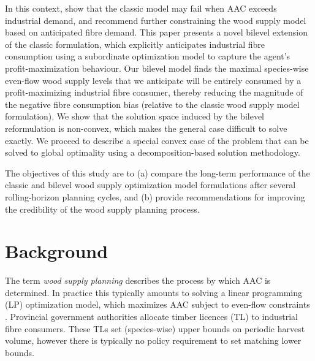 In this context, \citet{paradis2013risk} show that the classic model may fail when AAC exceeds industrial demand, and recommend further constraining the wood supply model based on anticipated fibre demand. This paper presents a novel bilevel extension of the classic formulation, which explicitly anticipates industrial fibre consumption using a subordinate optimization model to capture the agent's profit-maximization behaviour.
Our bilevel model finds the maximal species-wise even-flow wood supply levels that we anticipate will be entirely consumed by a profit-maximizing industrial fibre consumer, thereby reducing the magnitude of the negative fibre consumption bias (relative to the classic wood supply model formulation).  
We show that the solution space induced by the bilevel reformulation is non-convex, which makes the general case difficult to solve exactly. 
We proceed to describe a special convex case of the problem that can be solved to global optimality using a decomposition-based solution methodology. 

The objectives of this study are to (a) compare the long-term performance of the classic and bilevel wood supply optimization model formulations after several rolling-horizon planning cycles, and (b) provide recommendations for improving the credibility of the wood supply planning process.

\section{Background}
\label{sec:background2}

The term \emph{wood supply planning} describes the process by which AAC is determined. In practice this typically amounts to solving a linear programming (LP) optimization model, which maximizes AAC subject to even-flow constraints \citep{gunn2007models}. Provincial government authorities allocate timber licences (TL) to industrial fibre consumers. These TLs set (species-wise) upper bounds on periodic harvest volume, however there is typically no policy requirement to set matching lower bounds. 



